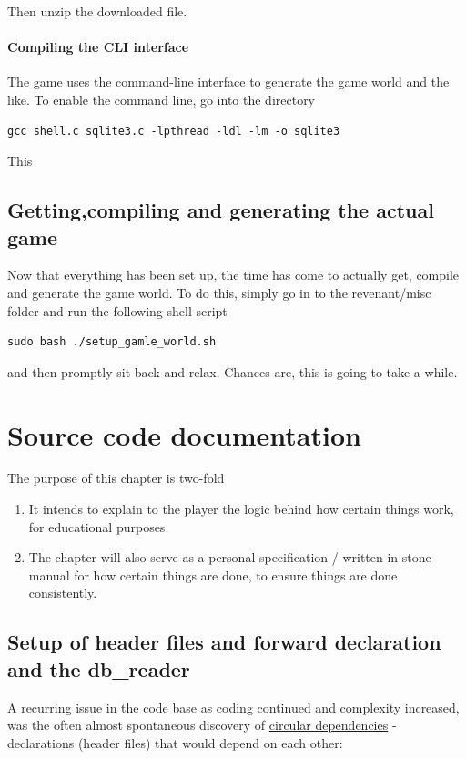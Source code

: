 \documentclass{report}
\begin{document}
Then unzip the downloaded file.
\subsubsection*{Compiling the CLI interface}
The game uses the command-line interface to generate the game world and the like. To enable the command line, go into the directory
\begin{lstlisting}
gcc shell.c sqlite3.c -lpthread -ldl -lm -o sqlite3
\end{lstlisting}
This 
\section*{Getting,compiling and generating the actual game}
Now that everything has been set up, the time has come to actually get, compile and generate the game world. To do this, simply go in to the revenant/misc folder and run the following shell script
\begin{lstlisting}
sudo bash ./setup_gamle_world.sh
\end{lstlisting}
and then promptly sit back and relax. Chances are, this is going to take a while.
\chapter{Source code documentation}
The purpose of this chapter is two-fold
\begin{enumerate}
\item It intends to explain to the player the logic behind how certain things work, for educational purposes.
\item The chapter will also serve as a personal specification / written in stone manual for how certain things are done, to ensure things are done consistently.
\end{enumerate}
\section*{Setup of header files and forward declaration and the db\_reader }
A recurring issue in the code base as coding continued and complexity increased, was the often almost spontaneous discovery of \underline{circular dependencies} - declarations (header files) that would depend on each other:
\end{document}
